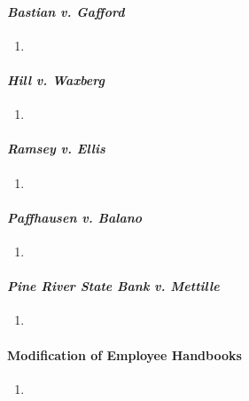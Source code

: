 \paragraph{\emph{Bastian v. Gafford}}

\begin{enumerate}
    \item %
\end{enumerate}

\paragraph{\emph{Hill v. Waxberg}}

\begin{enumerate}
    \item %
\end{enumerate}

\paragraph{\emph{Ramsey v. Ellis}}

\begin{enumerate}
    \item %
\end{enumerate}

\paragraph{\emph{Paffhausen v. Balano}}

\begin{enumerate}
    \item %
\end{enumerate}

\paragraph{\emph{Pine River State Bank v. Mettille}}

\begin{enumerate}
    \item %
\end{enumerate}

\paragraph{Modification of Employee Handbooks}

\begin{enumerate}
    \item %
\end{enumerate}

